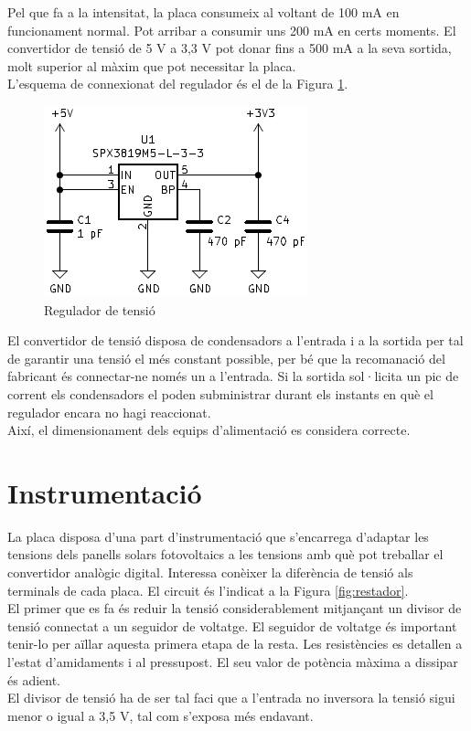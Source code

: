 \noindent Pel que fa a la intensitat, la placa consumeix al voltant de 100 mA en funcionament normal. Pot arribar a consumir uns 200 mA en certs moments. El convertidor de tensió de 5 V a 3,3 V pot donar fins a 500 mA a la seva sortida, molt superior al màxim que pot necessitar la placa.\\
\newline L'esquema de connexionat del regulador és el de la Figura \ref{fig: circuit_reg}.
\begin{figure}[H]
\begin{center}
\includegraphics[scale=0.5]{images/regulador.png}
\end{center}
\caption{Regulador de tensió}
\label{fig: circuit_reg}

\end{figure}
\noindent El convertidor de tensió disposa de condensadors a l'entrada i a la sortida per tal de garantir una tensió el més constant possible, per bé que la recomanació del fabricant és connectar-ne només un a l'entrada. Si la sortida sol·licita un pic de corrent els condensadors el poden subministrar durant els instants en què el regulador encara no hagi reaccionat.\\
\newline Així, el dimensionament dels equips d'alimentació es considera correcte.

\section{Instrumentació}
La placa disposa d'una part d'instrumentació que s'encarrega d'adaptar les tensions dels panells solars fotovoltaics a les tensions amb què pot treballar el convertidor analògic digital. Interessa conèixer la diferència de tensió als terminals de cada placa. El circuit és l'indicat a la Figura \ref{fig:restador}.\\
\newline El primer que es fa és reduir la tensió considerablement mitjançant un divisor de tensió connectat a un seguidor de voltatge. El seguidor de voltatge és important tenir-lo per aïllar aquesta primera etapa de la resta. Les resistències es detallen a l'estat d'amidaments i al pressupost. El seu valor de potència màxima a dissipar és adient.\\
\newline El divisor de tensió ha de ser tal faci que a l'entrada no inversora la tensió sigui menor o igual a 3,5 V, tal com s'exposa més endavant.

